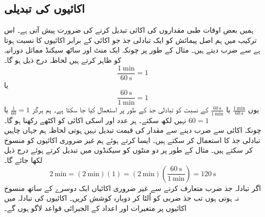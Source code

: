 \documentclass[leqno, b5paper]{khalid-urdu-book}
\begin{document}
	\subsection{اکائیوں کی تبدیلی}
	ہمیں بعض اوقات طبی مقداروں کی اکائی تبدیل کرنے کی ضرورت پیش آتی ہے۔ اس ترکیب میں ہم اصل پیمائش کو ایک تبادلی جذ جو اکائی کے برابر اکائیوں کا نسبت ہوتا ہے سے ضرب دیتے ہیں۔ مثال کے طور پر چونکہ ایک منٹ اور ساٹھ سیکنڈ مماثل دورانیہ کو ظاہر کرتے ہیں لحاظہ درج ذیل ہو گا۔
	\[\frac{\SI{1}{\minute}}{\SI{60}{\second}} = 1\]
	یا
	\[\frac{\SI{60}{\second}}{\SI{1}{\minute}} = 1\]
	یوں \(\frac{\SI{1}{\minute}}{\SI{60}{\second}}\) یا \(\frac{\SI{60}{\second}}{\SI{1}{\minute}}\) کے نسبت کو تبادلی جذ کے طور پر استعمال کیا جا سکتا ہے۔ ہم ہرگز \(\frac{\num{1}}{\num{60}}=1\) یا \(\num{60} = \num{1}\) نہیں لکھ سکتے۔ ہر عدد اور اسکی اکائی کو اکٹھے رکھنا ہو گا۔\\چونکہ اکائی سے ضرب دینے سے مقدار کی قیمت تبدیل نہیں ہوتی لحاظہ ہم جہاں چاہیں تبادلی جذ کا استعمال کر سکتے ہیں۔ ایسا کرتے ہوئے ہم غیر ضروری اکائیوں کو منسوخ کر سکتے ہیں۔ مثال کے طور پر دو منٹوں کو سیکنڈوں میں تبدیل کرتے ہوئے درج ذیل لکھا جائے گا۔
	\begin{equation}
		\SI{2}{\minute} = (\SI{2}{\minute})(\num{1}) = (\SI{2}{\minute})(\frac{\SI{60}{\second}}{\SI{1}{\minute}}) = \SI{120}{\second}
	\end{equation}
	اگر تبادلہ جذ ضرب متعارف  کرنے سے غیر  ضروری  اکائیاں ایک دوسرے کے ساتھ منسوخ نہ ہوتی ہوں تب جذ ضربی کو اُلٹا کر دوبارہ کوشش کریں۔ اکائیوں کی تبادلہ میں اکائیوں پر متغیرات اور اعداد کے الجبرائی قواعد لاگو ہوں گے۔
\end{document}
